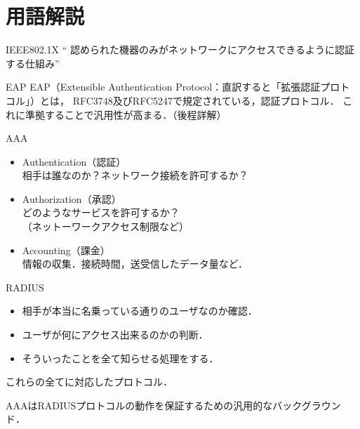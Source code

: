 \section{用語解説}
\begin{frame}[c]{\fft}
    \begin{block}{IEEE802.1X}
        `` 認められた機器のみがネットワークにアクセスできるように認証する仕組み''
    \end{block}
    \vfill
    \begin{block}{EAP}
        EAP（Extensible Authentication Protocol：直訳すると「拡張認証プロトコル」）とは，
        RFC3748及びRFC5247で規定されている，認証プロトコル．
        これに準拠することで汎用性が高まる．（後程詳解）
    \end{block}
\end{frame}
\begin{frame}[c]{\fft}
    \begin{block}{AAA}
        \begin{itemize}
            \item {\large A}uthentication（認証）\\
                  相手は誰なのか？ネットワーク接続を許可するか？
            \item {\large A}uthorization（承認）\\
                  どのようなサービスを許可するか？\\（ネットーワークアクセス制限など）
            \item {\large A}ccounting（課金）\\
                  情報の収集．接続時間，送受信したデータ量など．
        \end{itemize}
    \end{block}
\end{frame}
\begin{frame}[c]{\fft}
    \begin{block}{RADIUS}
        \begin{itemize}
            \item 相手が本当に名乗っている通りのユーザなのか確認．
            \item ユーザが何にアクセス出来るのかの判断．
            \item そういったことを全て知らせる処理をする．
        \end{itemize}
        これらの全てに対応したプロトコル．\par
        AAAはRADIUSプロトコルの動作を保証するための汎用的なバックグラウンド．
    \end{block}
\end{frame}